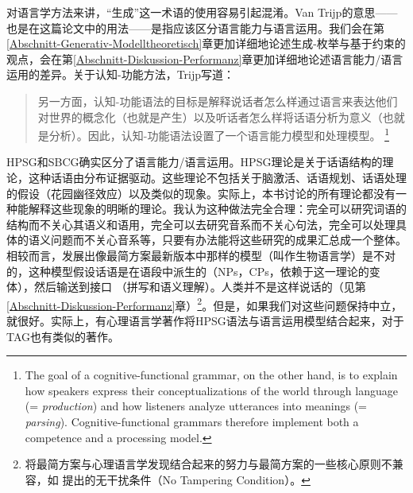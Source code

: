对语言学方法来讲，“生成”这一术语的使用容易引起混淆。Van Trijp的意思——也是在这篇论文中的用法——是指应该区分语言能力与语言运用。我们会在第\ref{Abschnitt-Generativ-Modelltheoretisch}章更加详细地论述生成-枚举与基于约束的观点，会在第\ref{Abschnitt-Diskussion-Performanz}章更加详细地论述语言能力/语言运用的差异。关于认知-功能方法，Trijp写道：
\begin{quotation}
另一方面，认知-功能语法的目标是解释说话者怎么样通过语言来表达他们对世界的概念化（也就是产生）以及听话者怎么样将话语分析为意义（也就是分析）。因此，认知-功能语法设置了一个语言能力模型和处理模型。 \citep[]{vanTrijp2013a}\footnote{%
The goal of a cognitive-functional grammar, on the other hand, is to explain
how speakers express their conceptualizations of the world through language
(= \emph{production}) and how listeners analyze utterances into meanings (= \emph{parsing}).
Cognitive-functional grammars therefore implement both a competence and a
processing model.}
\end{quotation}
HPSG和SBCG确实区分了语言能力/语言运用\citep{SW2011a}。HPSG理论是关于话语结构的理论，这种话语由分布证据驱动。这些理论不包括关于脑激活、话语规划、话语处理的假设（花园幽径效应）以及类似的现象。实际上，本书讨论的所有理论都没有一种能解释这些现象的明晰的理论。我认为这种做法完全合理：完全可以研究词语的结构而不关心其语义和语用，完全可以去研究音系而不关心句法，完全可以处理具体的语义问题而不关心音系等，只要有办法能将这些研究的成果汇总成一个整体。相较而言，发展出像最简方案\indexmp 最新版本中那样的模型（叫作生物语言学）是不对的，这种模型假设话语是在语段中派生的（NPs，CPs，依赖于这一理论的变体），然后输送到接口 （拼写和语义理解）。人类并不是这样说话的（见第\ref{Abschnitt-Diskussion-Performanz}章）\footnote{%
将最简方案与心理语言学发现结合起来的努力与最简方案的一些核心原则不兼容，如 \citet{Chomsky2008a}提出的无干扰条件（No Tampering Condition）。 
}。但是，如果我们对这些问题保持中立，就很好。实际上，有心理语言学著作将HPSG语法与语言运用模型结合起来\citep{Konieczny96a-u}，对于TAG也有类似的著作\citep{SJ93a,DK2008a-u}。
